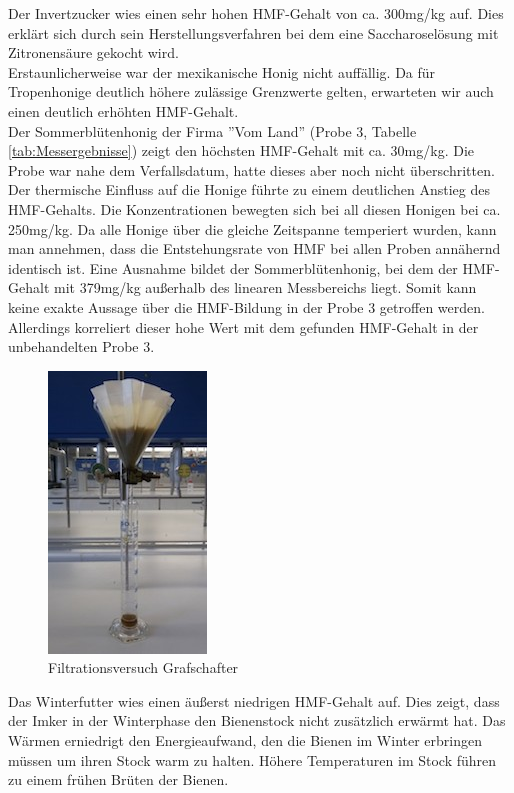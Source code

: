     Der Invertzucker wies einen sehr hohen HMF-Gehalt von ca. 300mg/kg auf. Dies erklärt sich durch sein Herstellungsverfahren bei dem eine Saccharoselösung mit Zitronensäure gekocht wird.\\
    Erstaunlicherweise war der mexikanische Honig nicht auffällig. Da für Tropenhonige deutlich höhere zulässige Grenzwerte gelten, erwarteten wir auch einen deutlich erhöhten HMF-Gehalt. \\
    Der Sommerblütenhonig der Firma ''Vom Land'' (Probe 3, Tabelle \ref{tab:Messergebnisse}) zeigt den höchsten HMF-Gehalt mit ca. 30mg/kg. Die Probe war nahe dem Verfallsdatum, hatte dieses aber noch nicht überschritten.\\
    Der thermische Einfluss auf die Honige führte zu einem deutlichen Anstieg des HMF-Gehalts. Die Konzentrationen bewegten sich bei all diesen Honigen bei ca. 250mg/kg. Da alle Honige über die gleiche Zeitspanne temperiert wurden, kann man annehmen, dass die Entstehungsrate von HMF bei allen Proben annähernd identisch ist. Eine Ausnahme bildet der Sommerblütenhonig, bei dem der HMF-Gehalt mit 379mg/kg außerhalb des linearen Messbereichs liegt. Somit kann keine exakte Aussage über die HMF-Bildung in der Probe 3 getroffen werden. Allerdings korreliert dieser hohe Wert mit dem gefunden HMF-Gehalt in der unbehandelten Probe 3.
    \begin{figure}[b!]
      \centering
      \includegraphics{../Bilder/20150427_153416.jpg}
      \caption{Filtrationsversuch Grafschafter}
      \label{fig:Grafschafter}
    \end{figure}
    Das Winterfutter wies einen äußerst niedrigen HMF-Gehalt auf. Dies zeigt, dass der Imker in der Winterphase den Bienenstock nicht zusätzlich erwärmt hat. Das Wärmen erniedrigt den Energieaufwand, den die Bienen im Winter erbringen müssen um ihren Stock warm zu halten. Höhere Temperaturen im Stock führen zu einem frühen Brüten der Bienen.~\cite{Imkern}\\
